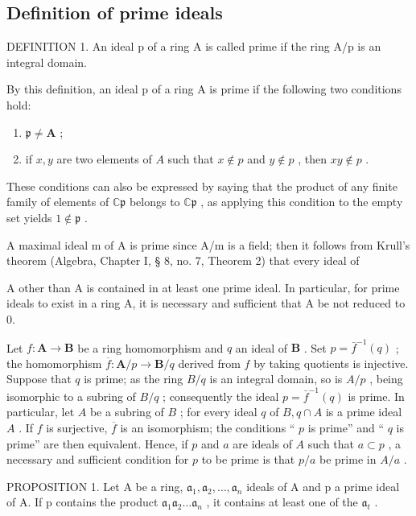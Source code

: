 \subsection{Definition of prime ideals}

DEFINITION 1. An ideal p of a ring A is called prime if the ring A/p is an integral domain.

By this definition, an ideal p of a ring A is prime if the following two conditions hold:

\begin{enumerate}
\def\labelenumi{(\arabic{enumi})}
\item
  \(\mathfrak{p} \neq \mathbf{A}\) ;
\item
  if \(x, y\) are two elements of \(A\) such that \(x \notin p\) and \(y \notin p\) , then \(xy \notin p\) .
\end{enumerate}

These conditions can also be expressed by saying that the product of any finite family of elements of \(\mathbb{C}\mathfrak{p}\) belongs to \(\mathbb{C}\mathfrak{p}\) , as applying this condition to the empty set yields \(1\notin\mathfrak{p}\) .

A maximal ideal m of A is prime since A/m is a field; then it follows from Krull's theorem (Algebra, Chapter I, § 8, no. 7, Theorem 2) that every ideal of

A other than A is contained in at least one prime ideal. In particular, for prime ideals to exist in a ring A, it is necessary and sufficient that A be not reduced to 0.

Let \(f: \mathbf{A} \to \mathbf{B}\) be a ring homomorphism and \(q\) an ideal of \(\mathbf{B}\) . Set \(p = \bar{f}^{-1}(q)\) ; the homomorphism \(\overline{f}: \mathbf{A}/p \to \mathbf{B}/q\) derived from \(f\) by taking quotients is injective. Suppose that \(q\) is prime; as the ring \(B/q\) is an integral domain, so is \(A/p\) , being isomorphic to a subring of \(B/q\) ; consequently the ideal \(p = \bar{f}^{-1}(q)\) is prime. In particular, let \(A\) be a subring of \(B\) ; for every ideal \(q\) of \(B, q \cap A\) is a prime ideal \(A\) . If \(f\) is surjective, \(\overline{f}\) is an isomorphism; the conditions `` \(p\) is prime'' and `` \(q\) is prime'' are then equivalent. Hence, if \(p\) and \(a\) are ideals of \(A\) such that \(a \subset p\) , a necessary and sufficient condition for \(p\) to be prime is that \(p/a\) be prime in \(A/a\) .

PROPOSITION 1. Let A be a ring, \(\mathfrak{a}_1, \mathfrak{a}_2, \ldots, \mathfrak{a}_n\) ideals of A and p a prime ideal of A. If p contains the product \(\mathfrak{a}_1\mathfrak{a}_2 \ldots \mathfrak{a}_n\) , it contains at least one of the \(\mathfrak{a}_t\) .

